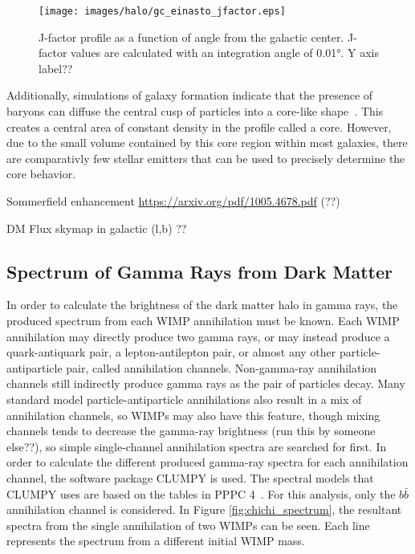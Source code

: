     \begin{figure}[ht]
    \centering
      \texttt{[image: images/halo/gc\_einasto\_jfactor.eps]}
      \caption[Galactic Center Einasto Halo Jfactor]{
        J-factor profile as a function of angle from the galactic center.
        J-factor values are calculated with an integration angle of \ang{0.01}.
        {\color{red}Y axis label??}
      }
      \label{fig:gchalo_jfactor}
    \end{figure}
    
    Additionally, simulations of galaxy formation indicate that the presence of baryons can diffuse the central cusp of particles into a core-like shape~\cite{corecusp_baryondiffuse1,corecusp_baryondiffuse2}.
    This creates a central area of constant density in the profile called a core.
    However, due to the small volume contained by this core region within most galaxies, there are comparativly few stellar emitters that can be used to precisely determine the core behavior.

    {\color{red}Sommerfield enhancement \url{https://arxiv.org/pdf/1005.4678.pdf} (??)}

    
    {\color{red}DM Flux skymap in galactic (l,b) ??}
    
  \subsection{Spectrum of Gamma Rays from Dark Matter}\label{dm_spectral}
    In order to calculate the brightness of the dark matter halo in gamma rays, the produced spectrum from each WIMP annihilation must be known.
    Each WIMP annihilation may directly produce two gamma rays, or may instead produce a quark-antiquark pair, a lepton-antilepton pair, or almost any other particle-antiparticle pair, called annihilation channels. 
    Non-gamma-ray annihilation channels still indirectly produce gamma rays as the pair of particles decay.
    Many standard model particle-antiparticle annihilations also result in a mix of annihilation channels, so WIMPs may also have this feature, though mixing channels tends to {\color{red}decrease the gamma-ray brightness (run this by someone else??)}, so simple single-channel annihilation spectra are searched for first.
    In order to calculate the different produced gamma-ray spectra for each annihilation channel, the software package CLUMPY \cite{CLUMPYcode} is used.
    The spectral models that CLUMPY uses are based on the tables in PPPC 4~\cite{pppc4_dm_spectra}.
    For this analysis, only the $b\bar{b}$ annihilation channel is considered.
    In Figure \ref{fig:chichi_spectrum}, the resultant spectra from the single annihilation of two WIMPs can be seen.
    Each line represents the spectrum from a different initial WIMP mass.

